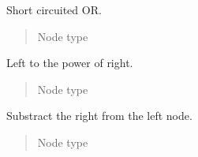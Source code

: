 \documentclass[a4paper,10pt,english]{sphinxmanual}
\begin{document}
\begin{fulllineitems}
\label{extensions:jinja2.nodes.Or}
Short circuited OR.
\begin{quote}\begin{description}
\item[{Node type}] \leavevmode
{\hyperref[extensions:jinja2.nodes.BinExpr]{}}

\end{description}\end{quote}

\end{fulllineitems}


\begin{fulllineitems}
\label{extensions:jinja2.nodes.Pow}
Left to the power of right.
\begin{quote}\begin{description}
\item[{Node type}] \leavevmode
{\hyperref[extensions:jinja2.nodes.BinExpr]{}}

\end{description}\end{quote}

\end{fulllineitems}


\begin{fulllineitems}
\label{extensions:jinja2.nodes.Sub}
Substract the right from the left node.
\begin{quote}\begin{description}
\item[{Node type}] \leavevmode
{\hyperref[extensions:jinja2.nodes.BinExpr]{}}

\end{description}\end{quote}

\end{fulllineitems}

\end{document}

